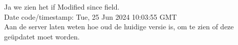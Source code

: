 Ja we zien het if Modified since field.\\
Date code/timestamp: Tue, 25 Jun 2024 10:03:55 GMT\\
Aan de server laten weten hoe oud de huidige versie is, om te zien of deze geüpdatet moet worden.
